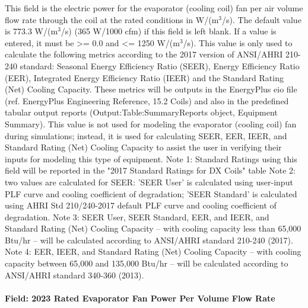 This field is the electric power for the evaporator (cooling coil) fan per air volume flow rate through the coil at the rated conditions in W/(m\(^{3}\)/s). The default value is 773.3 W/(m\(^{3}\)/s) (365 W/1000 cfm) if this field is left blank. If a value is entered, it must be \textgreater{}= 0.0 and \textless{}= 1250 W/(m\(^{3}\)/s). This value is only used to calculate the following metrics according to the 2017 version of ANSI/AHRI 210-240 standard: Seasonal Energy Efficiency Ratio (SEER), Energy Efficiency Ratio (EER), Integrated Energy Efficiency Ratio (IEER) and the Standard Rating (Net) Cooling Capacity.  These metrics will be outputs in the EnergyPlus eio file (ref. EnergyPlus Engineering Reference, 15.2 Coils) and also in the predefined tabular output reports (Output:Table:SummaryReports object, Equipment Summary). This value is not used for modeling the evaporator (cooling coil) fan during simulations; instead, it is used for calculating SEER, EER, IEER, and Standard Rating (Net) Cooling Capacity to assist the user in verifying their inputs for modeling this type of equipment.
Note 1: Standard Ratings using this field will be reported in the "2017 Standard Ratings for DX Coils" table
Note 2: two values are calculated for SEER: 'SEER User' is calculated using user-input PLF curve and cooling coefficient of degradation; 'SEER Standard' is calculated using AHRI Std 210/240-2017 default PLF curve and cooling coefficient of degradation.
Note 3: SEER User, SEER Standard, EER, and IEER, and Standard Rating (Net) Cooling Capacity -- with cooling capacity less than 65,000 Btu/hr -- will be calculated according to ANSI/AHRI standard 210-240 (2017).
Note 4: EER, IEER, and Standard Rating (Net) Cooling Capacity -- with cooling capacity between 65,000 and 135,000 Btu/hr -- will be calculated according to ANSI/AHRI standard 340-360 (2013).

\paragraph{Field: 2023 Rated Evaporator Fan Power Per Volume Flow Rate}

